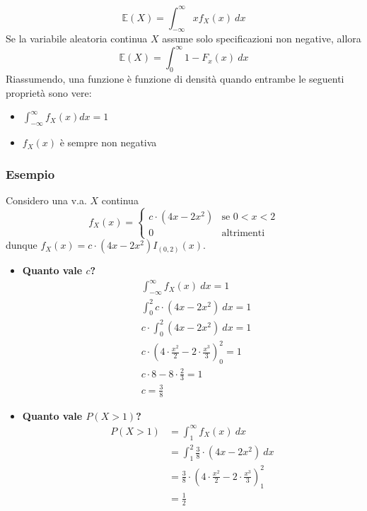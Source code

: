 \documentclass[11pt]{report}
\begin{document}
\begin{equation}
    \mathbb{E}(X) = \int_{-\infty}^{\infty} x f_X(x)\ dx
\end{equation}
Se la variabile aleatoria continua $X$ assume solo specificazioni non negative, allora
\begin{equation}
    \mathbb{E}(X) = \int_0^{\infty}1  - F_x(x)\ dx
\end{equation}
Riassumendo, una funzione è funzione di densità quando entrambe le seguenti proprietà sono vere:
\begin{itemize}
	\item $\int_{-\infty}^{\infty}f_X(x) dx = 1$
	\item $f_X(x)$ è sempre non negativa
\end{itemize}
\subsubsection{Esempio}
Considero una v.a. $X$ continua
\begin{equation}
	f_X(x) =
    \begin{cases}
		c \cdot (4x - 2x^2)   		& \text{se } 0 < x < 2\\
		0							& \text{altrimenti}
	\end{cases}
\end{equation}
dunque $f_X(x) = c \cdot (4x - 2x^2) I_{(0,2)}(x)$.
\begin{itemize}
	\item \textbf{Quanto vale $c$?}
    \begin{equation}
        \begin{split}
            & \int_{-\infty}^{\infty}f_X(x)\ dx = 1\\
        	& \int_{0}^{2} c \cdot (4x - 2x^2)\ dx = 1\\
        	& c \cdot \int_{0}^{2}(4x - 2x^2)\ dx = 1\\
        	& c \cdot \left(4 \cdot \frac{x^2}{2} - 2 \cdot \frac{x^3}{3}\right)_0^2 = 1\\
        	& c \cdot 8 - 8 \cdot \frac{2}{3} = 1\\
        	& c = \frac{3}{8}
        \end{split}
    \end{equation}
	\item \textbf{Quanto vale $P(X > 1)$?}
    \begin{equation}
        \begin{split}
            P(X > 1) & = \int_{1}^{\infty}f_X(x)\ dx\\
            & = \int_{1}^{2} \frac{3}{8} \cdot (4x - 2x^2)\ dx\\
            & = \frac{3}{8} \cdot \left(4 \cdot \frac{x^2}{2} - 2 \cdot \frac{x^3}{3}\right)_1^2\\
            & = \frac{1}{2}
        \end{split}
    \end{equation}
\end{itemize}
\end{document}
